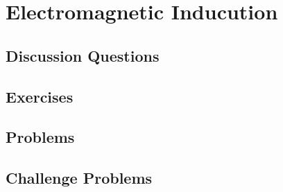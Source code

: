 
\chapter{Electromagnetic Inducution}

\section{Discussion Questions}

\section{Exercises}

\section{Problems}

\section{Challenge Problems}
